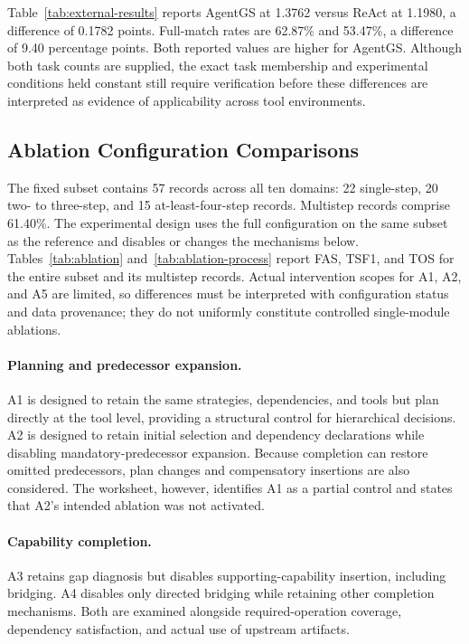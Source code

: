 Table~\ref{tab:external-results} reports AgentGS at 1.3762 versus ReAct at 1.1980, a difference of 0.1782 points. Full-match rates are 62.87\% and 53.47\%, a difference of 9.40 percentage points. Both reported values are higher for AgentGS. Although both task counts are supplied, the exact task membership and experimental conditions held constant still require verification before these differences are interpreted as evidence of applicability across tool environments.


\subsection{Ablation Configuration Comparisons}
\label{sec:ablations}
The fixed subset contains 57 records across all ten domains: 22 single-step, 20 two- to three-step, and 15 at-least-four-step records. Multistep records comprise 61.40\%. The experimental design uses the full configuration on the same subset as the reference and disables or changes the mechanisms below. Tables~\ref{tab:ablation} and~\ref{tab:ablation-process} report FAS, TSF1, and TOS for the entire subset and its multistep records. Actual intervention scopes for A1, A2, and A5 are limited, so differences must be interpreted with configuration status and data provenance; they do not uniformly constitute controlled single-module ablations.

\paragraph{Planning and predecessor expansion.}
A1 is designed to retain the same strategies, dependencies, and tools but plan directly at the tool level, providing a structural control for hierarchical decisions. A2 is designed to retain initial selection and dependency declarations while disabling mandatory-predecessor expansion. Because completion can restore omitted predecessors, plan changes and compensatory insertions are also considered. The worksheet, however, identifies A1 as a partial control and states that A2's intended ablation was not activated.

\paragraph{Capability completion.}
A3 retains gap diagnosis but disables supporting-capability insertion, including bridging. A4 disables only directed bridging while retaining other completion mechanisms. Both are examined alongside required-operation coverage, dependency satisfaction, and actual use of upstream artifacts.

